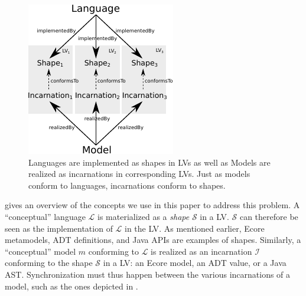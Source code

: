 \begin{figure}[bt]
	\centering
	\includegraphics[width=.6\columnwidth]{figures/shape-diverse-lang}
	\caption{Languages are implemented as shapes in LVs as well as Models are realized as incarnations in corresponding LVs. Just as models conform to languages, incarnations conform to shapes.}
	\label{fig:concepts}
\end{figure}

 gives an overview of the concepts we use in this paper to address this problem.
A ``conceptual'' language $\mathcal{L}$ is materialized as a \emph{shape} $\mathcal{S}$ in a LV.
$\mathcal{S}$ can therefore be seen as the implementation of $\mathcal{L}$ in the LV.
As mentioned earlier, Ecore metamodels, ADT definitions, and Java APIs are examples of shapes.
Similarly, a ``conceptual'' model $m$ conforming to $\mathcal{L}$ is realized as an incarnation $\mathcal{I}$ conforming to the shape $\mathcal{S}$ in a LV: an Ecore model, an ADT value, or a Java AST.
Synchronization must thus happen between the various incarnations of a model, such as the ones depicted in .


